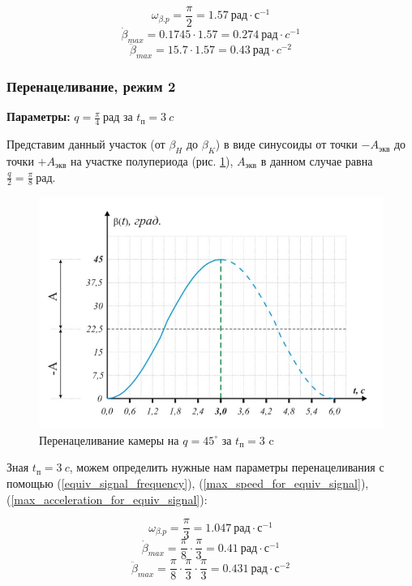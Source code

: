 $$
    \omega_{\beta.p} = \frac{\pi}{2} = 1.57 ~\textit{рад} \cdot \textit{с}^{-1}
$$
$$
    \dot{\beta}_{max} = 0.1745 \cdot 1.57 = 0.274 ~\textit{рад} \cdot \textit{c}^{-1}
$$
$$
    \ddot{\beta}_{max} = 15.7 \cdot 1.57 = 0.43 ~\textit{рад}  \cdot \textit{c}^{-2}
$$

\subsubsection{Перенацеливание, режим 2}

\textbf{Параметры:} $q = \frac{\pi}{4} ~\textit{рад}$ за $t_{\textit{п}} = 3 ~\textit{c}$

Представим данный участок (от $\beta_{H}$ до $\beta_{K}$) в виде синусоиды от
точки $-A_\textit{экв}$ до точки $+A_\textit{экв}$ на участке полупериода
(рис. \ref{retarget_45grad_3sec}), $A_\textit{экв}$ в данном случае равна
$\frac{q}{2} = \frac{\pi}{8} ~\textit{рад}$.

\begin{figure}[h!]
    \centering
    \includegraphics[keepaspectratio]{./src/pictures/retarget_equivalent_input_signals/45grad_3sec}
    \caption{Перенацеливание камеры на $q = 45^{\circ}$ за $t_\textit{п} = 3$ c}
    \label{retarget_45grad_3sec}
\end{figure}

Зная $t_{\textit{п} } = 3 ~\textit{c}$, можем определить нужные нам параметры перенацеливания
с помощью (\ref{equiv_signal_frequency}),
(\ref{max_speed_for_equiv_signal}),
(\ref{max_acceleration_for_equiv_signal}):

$$
    \omega_{\beta.p} = \frac{\pi}{3} = 1.047 ~\textit{рад} \cdot \textit{с}^{-1}
$$
$$
    \dot{\beta}_{max} = \frac{\pi}{8} \cdot \frac{\pi}{3} = 0.41 ~\textit{рад} \cdot \textit{с}^{-1}
$$
$$
    \ddot{\beta}_{max} = \frac{\pi}{8} \cdot \frac{\pi}{3} \cdot \frac{\pi}{3} = 0.431 ~\textit{рад} \cdot \textit{с}^{-2}
$$

